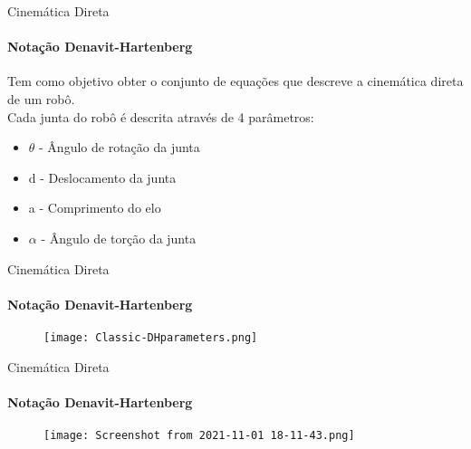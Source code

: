 \begin{frame}[c]{Cinemática Direta} 
    \framesubtitle{Notação Denavit-Hartenberg}
    Tem como objetivo obter o conjunto de equações que descreve a cinemática direta de um robô. \\
    Cada junta do robô é descrita através de 4 parâmetros:
    \begin{itemize}
        \item $\theta$ - Ângulo de rotação da junta
        \item d - Deslocamento da junta
        \item a - Comprimento do elo
        \item $\alpha$ - Ângulo de torção da junta
        
    \end{itemize}
\end{frame}
\begin{frame}[c]{Cinemática Direta} 
    \framesubtitle{Notação Denavit-Hartenberg}
    \large
    
    \begin{figure}
        \texttt{[image: Classic-DHparameters.png]}
    \end{figure}
\end{frame}
\begin{frame}[c]{Cinemática Direta} 
    \framesubtitle{Notação Denavit-Hartenberg}
    \large
    
    \begin{figure}
        \texttt{[image: Screenshot from 2021-11-01 18-11-43.png]}
    \end{figure}
\end{frame}

